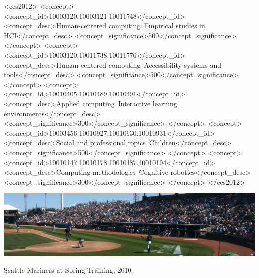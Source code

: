 \documentclass[sigconf]{acmart}
\begin{document}
\begin{CCSXML}
<ccs2012>
     <concept>
         <concept_id>10003120.10003121.10011748</concept_id>
         <concept_desc>Human-centered computing~Empirical studies in HCI</concept_desc>
         <concept_significance>500</concept_significance>
         </concept>
     <concept>
         <concept_id>10003120.10011738.10011776</concept_id>
         <concept_desc>Human-centered computing~Accessibility systems and tools</concept_desc>
         <concept_significance>500</concept_significance>
         </concept>
     <concept>
         <concept_id>10010405.10010489.10010491</concept_id>
         <concept_desc>Applied computing~Interactive learning environments</concept_desc>
         <concept_significance>300</concept_significance>
         </concept>
     <concept>
         <concept_id>10003456.10010927.10010930.10010931</concept_id>
         <concept_desc>Social and professional topics~Children</concept_desc>
         <concept_significance>500</concept_significance>
         </concept>
     <concept>
         <concept_id>10010147.10010178.10010187.10010194</concept_id>
         <concept_desc>Computing methodologies~Cognitive robotics</concept_desc>
         <concept_significance>300</concept_significance>
         </concept>
</ccs2012>
\end{CCSXML}



\begin{teaserfigure}
  \includegraphics[width=\textwidth]{sampleteaser}
  \caption{Seattle Mariners at Spring Training, 2010.}
  \label{fig:teaser}
\end{teaserfigure}
\end{document}
